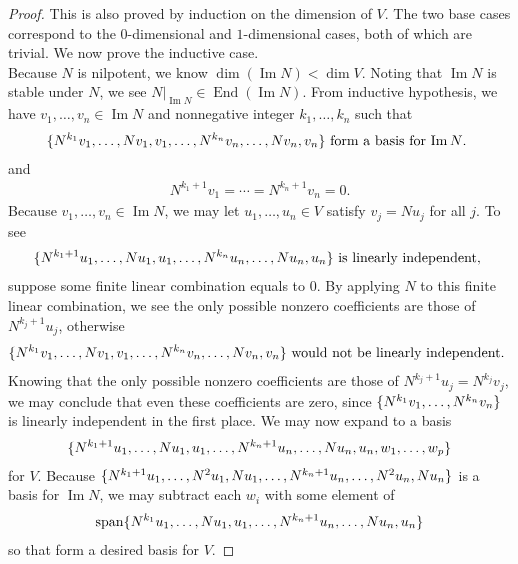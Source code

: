 \documentclass{report}
\begin{document}
\begin{proof}
This is also proved by induction on the dimension of $V$. The two base cases correspond to the $0$-dimensional and $1$-dimensional cases, both of which are trivial. We now prove the inductive case. \\

Because $N$ is nilpotent, we know  $\operatorname{dim}(\operatorname{Im}N)< \operatorname{dim}V$. Noting that $\operatorname{Im}N$ is stable under $N$, we see $N|_{\operatorname{Im}N}\in \operatorname{End}(\operatorname{Im}N)$. From inductive hypothesis, we have $v_1,\dots ,v_n\in \operatorname{Im}N$ and nonnegative integer $k_1,\dots ,k_n$ such that 
\begin{align*}
  \{ N^{k_1}v_1,\dots ,Nv_1,v_1, \dots ,N^{k_n}v_n,\dots ,Nv_n,v_n \}\text{ form a basis for $\operatorname{Im}N$. }
\end{align*}
and 
\begin{align*}
N^{k_1+1}v_1=\cdots = N^{k_n+1}v_n=0. 
\end{align*}
Because $v_1,\dots ,v_n \in \operatorname{Im}N$, we may let $u_1,\dots ,u_n \in V$ satisfy $v_j=Nu_j$ for all  $j$. To see 
\begin{align}
\label{setn}
  \{ N^{k_1+1}u_1 ,\dots ,Nu_1,u_1, \dots ,N^{k_n}u_n,\dots ,Nu_n,u_n \}\text{ is linearly independent, }
\end{align}
suppose some finite linear combination equals to $0$. By applying $N$ to this finite linear combination, we see the only possible nonzero coefficients are those of $N^{k_j+1}u_j$, otherwise 
\begin{align*}
  \{ N^{k_1}v_1,\dots ,Nv_1,v_1,\dots ,N^{k_n}v_n,\dots ,Nv_n,v_n \}\text{ would not be linearly independent. }
\end{align*}
Knowing that the only possible nonzero coefficients are those of $N^{k_j+1}u_j=N^{k_j}v_j$, we may conclude that even these coefficients are zero, since $\{ N^{k_1}v_1,\dots ,N^{k_n}v_n \}$ is linearly independent in the first place. We may now expand  to a basis 
\begin{align}
\label{set1}
\{ N^{k_1+1}u_1,\dots ,Nu_1,u_1,\dots ,N^{k_n+1}u_n,\dots ,Nu_n,u_n,w_1,\dots ,w_p \}
\end{align}
for $V$. Because $\{ N^{k_1+1}u_1,\dots ,N^2u_1,Nu_1,\dots ,N^{k_n+1}u_n,\dots ,N^2u_n,Nu_n \}$ is a basis for  $\operatorname{Im}N$, we may subtract each $w_i$ with some element of 
\begin{align*}
\operatorname{span} \{ N^{k_1}u_1,\dots ,Nu_1,u_1,\dots , N^{k_n+1}u_n,\dots ,Nu_n,u_n \}
\end{align*}
so that   form a desired basis for $V$.    
\end{proof}
\end{document}

